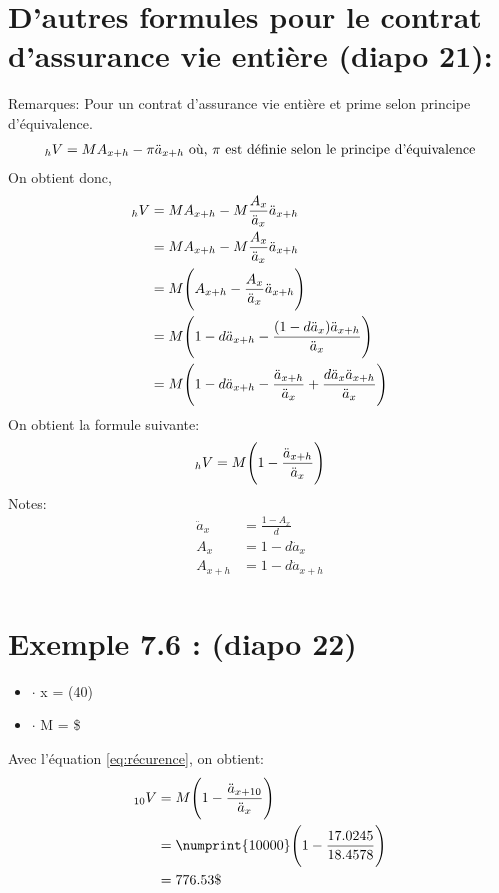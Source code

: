 \documentclass[11pt,french]{report}
\newcommand{\indiceGauche}[2]{{\vphantom{#2}}_{#1}#2}
\begin{document}
\section{D'autres formules pour le contrat d'assurance vie entière (diapo 21):}
Remarques: Pour un contrat d'assurance vie entière et prime selon principe d'équivalence.
\begin{align*}
\indiceGauche{h}{V} = M A_{x+h} - \pi \ddot{a}_{x+h} \text{ où, $\pi$ est définie selon le principe d'équivalence}
\end{align*}
On obtient donc,
\begin{align*}
\indiceGauche{h}{V} &= M A_{x+h} - M\frac{A_x}{\ddot{a}_x} \ddot{a}_{x+h}\\
&= M A_{x+h} - M\frac{A_x}{\ddot{a}_x} \ddot{a}_{x+h}\\
&= M\Bigg(A_{x+h} - \frac{A_x}{\ddot{a}_x} \ddot{a}_{x+h} \Bigg)\\
&= M\Bigg(1 - d\ddot{a}_{x+h} - \frac{(1 - d \ddot{a}_{x})\ddot{a}_{x+h}}{\ddot{a}_{x}}\Bigg)\\
&=M \Bigg(1 - d\ddot{a}_{x+h} - \frac{\ddot{a}_{x+h}}{\ddot{a}_{x}} + \frac{d \ddot{a}_{x}\ddot{a}_{x+h}}{\ddot{a}_{x}}\Bigg)\\
\end{align*}
On obtient la formule suivante:
\begin{equation}
\label{eq:récurence}
\indiceGauche{h}{V} = M\Bigg(1 - \frac{\ddot{a}_{x+h}}{\ddot{a}_{x}}\Bigg)
\end{equation}
Notes:
\begin{align*}
\ddot{a}_{x} & = \frac{1 - A_x}{d}\\
A_x &= 1 - d\ddot{a}_{x}\\
A_{x+h} &= 1 - d\ddot{a}_{x+h}\\
\end{align*}

\section{Exemple 7.6 : (diapo 22)}
\begin{itemize}
\item $ \cdot $ x = (40)
\item $ \cdot $ M = \$
\end{itemize}
Avec l'équation \ref{eq:récurence}, on obtient:
\begin{align*}
\indiceGauche{10}{V} &= M\Bigg(1 - \frac{\ddot{a}_{x+10}}{\ddot{a}_{x}}\Bigg) \\
&= \numprint{10000}\Bigg(1 - \frac{17.0245}{18.4578}\Bigg)\\
&=776.53\$
\end{align*}
\end{document}
